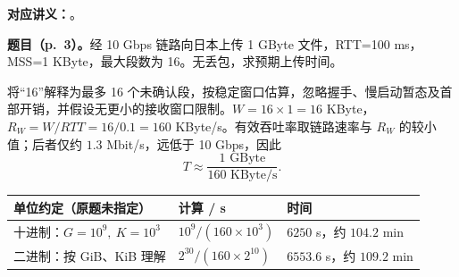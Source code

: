 \textbf{对应讲义：}。

\textbf{题目（p.~3）。}经 10 Gbps 链路向日本上传 1 GByte 文件，RTT=100 ms，MSS=1 KByte，最大段数为 16。无丢包，求预期上传时间。

\begin{checkedsolution}
将“16”解释为最多 16 个未确认段，按稳定窗口估算，忽略握手、慢启动暂态及首部开销，并假设无更小的接收窗口限制。$W=16\times1=16$ KByte，$R_W=W/RTT=16/0.1=160$ KByte/s。有效吞吐率取链路速率与 $R_W$ 的较小值；后者仅约 $1.3$ Mbit/s，远低于 10 Gbps，因此
\[
 T\approx\frac{1\text{ GByte}}{160\text{ KByte/s}}.
\]
\begin{center}
\small
\begin{tabular}{@{}lll@{}}
\toprule
单位约定（原题未指定） & 计算 / s & 时间 \\
\midrule
十进制：$G=10^9,\ K=10^3$ & $10^9/(160\times10^3)$ & $6250$ s，约 $104.2$ min \\
二进制：按 GiB、KiB 理解 & $2^{30}/(160\times2^{10})$ & $6553.6$ s，约 $109.2$ min \\
\bottomrule
\end{tabular}
\end{center}
\end{checkedsolution}
\endgroup
